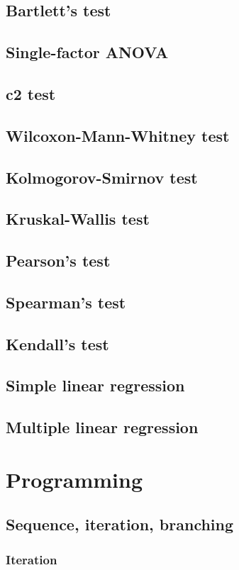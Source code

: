\documentclass{report}
\begin{document}
	\section{Bartlett’s test}
	\section{Single-factor ANOVA}
	\section{c2 test}
	\section{Wilcoxon-Mann-Whitney test}
	\section{Kolmogorov-Smirnov test}
	\section{Kruskal-Wallis test}
	\section{Pearson’s test}
	\section{Spearman’s test}
	\section{Kendall’s test}
	\section{Simple linear regression}
	\section{Multiple linear regression}

\chapter{Programming}
	\section{Sequence, iteration, branching}
		\subsection{Iteration}\label{subsec:iteration}
\end{document}
